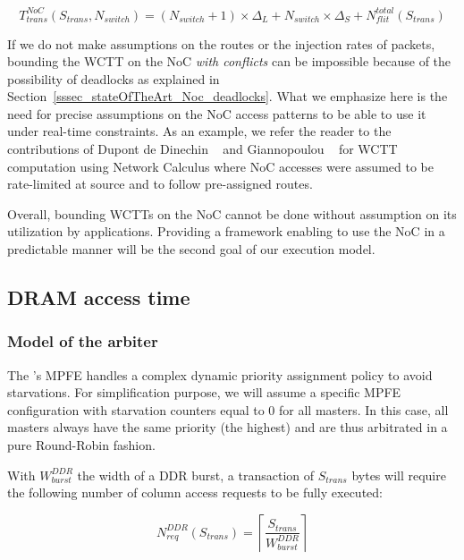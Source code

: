\documentclass[main.tex]{subfiles}
\begin{document}
\begin{equation}
    T_{trans}^{NoC} (S_{trans} , N_{switch}) = 
    (N_{switch} + 1) \times \Delta_L +
    N_{switch}  \times \Delta_S +
    N_{flit}^{total} ( S_{trans} )
    \label{eq_execModel_NocTransNoConflict}
\end{equation}

If we do not make assumptions on the routes or the injection rates of packets, bounding the WCTT on the NoC \emph{with conflicts} can be impossible because of the possibility of deadlocks as explained in Section~\ref{sssec_stateOfTheArt_Noc_deadlocks}. What we emphasize here is the need for precise assumptions on the NoC access patterns to be able to use it under real-time constraints.
As an example, we refer the reader to the contributions of Dupont de Dinechin \etal~\cite{Dinechin2014} and Giannopoulou \etal~\cite{Giannopoulou2015} for WCTT computation using Network Calculus where NoC accesses were assumed to be rate-limited at source and to follow pre-assigned routes.

Overall, bounding WCTTs on the NoC cannot be done without assumption on its utilization by applications. Providing a framework enabling to use the NoC in a predictable manner will be the second goal of our execution model.

\subsection{DRAM access time}
\label{ssec_execModel_DRAMaccessTime}
\subsubsection{Model of the arbiter}
The \mppalong's MPFE handles a complex dynamic priority assignment policy to avoid starvations. For simplification purpose, we will assume a specific MPFE configuration with starvation counters equal to 0 for all masters. In this case, all masters always have the same priority (the highest) and are thus arbitrated in a pure Round-Robin fashion.

With $W_{burst}^{DDR}$ the width of a DDR burst, a transaction of $S_{trans}$ bytes will require the following number of column access requests to be fully executed:

\begin{displaymath}
    N_{req}^{DDR}(S_{trans}) = \left\lceil \dfrac{S_{trans}}{W_{burst}^{DDR}} \right\rceil
\end{displaymath}
\end{document}
